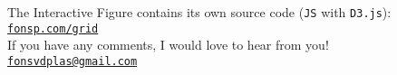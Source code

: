 \documentclass{report}
\theoremstyle{definition}
\theoremstyle{remark}
\begin{document}
{The Interactive Figure contains its own source code (\texttt{JS} with \texttt{D3.js}):}\\[1em]
\hphantom{asdfsdzz}\href{https://fonsp.com/grid}{\texttt{fonsp.com/grid}}\\[2em]

{If you have any comments, I would love to hear from you!}\\[1em]
\hphantom{asdfsdzz}\href{mailto:fonsvdplas@gmail.com}{\texttt{fonsvdplas@gmail.com}}\\[2em]

\end{document}
